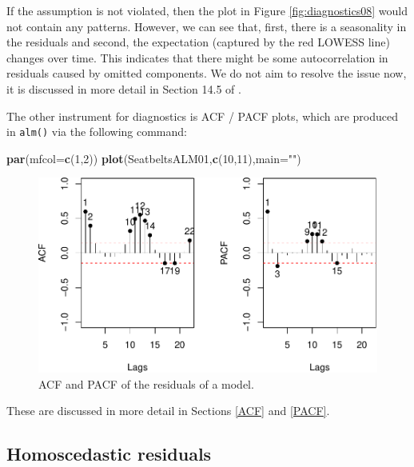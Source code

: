 \documentclass[
]{book}
\newenvironment{Shaded}{\begin{snugshade}}{\end{snugshade}}
\newcommand{\DataTypeTok}[1]{\textcolor[rgb]{0.13,0.29,0.53}{#1}}
\newcommand{\DecValTok}[1]{\textcolor[rgb]{0.00,0.00,0.81}{#1}}
\newcommand{\KeywordTok}[1]{\textcolor[rgb]{0.13,0.29,0.53}{\textbf{#1}}}
\newcommand{\NormalTok}[1]{#1}
\newcommand{\StringTok}[1]{\textcolor[rgb]{0.31,0.60,0.02}{#1}}
\theoremstyle{definition}
\theoremstyle{definition}
\theoremstyle{definition}
\theoremstyle{definition}
\theoremstyle{remark}
\begin{document}
If the assumption is not violated, then the plot in Figure \ref{fig:diagnostics08} would not contain any patterns. However, we can see that, first, there is a seasonality in the residuals and second, the expectation (captured by the red LOWESS line) changes over time. This indicates that there might be some autocorrelation in residuals caused by omitted components. We do not aim to resolve the issue now, it is discussed in more detail in Section 14.5 of \citet{SvetunkovADAM}.

The other instrument for diagnostics is ACF / PACF plots, which are produced in \texttt{alm()} via the following command:

\begin{Shaded}
\begin{Highlighting}[]
\KeywordTok{par}\NormalTok{(}\DataTypeTok{mfcol=}\KeywordTok{c}\NormalTok{(}\DecValTok{1}\NormalTok{,}\DecValTok{2}\NormalTok{))}
\KeywordTok{plot}\NormalTok{(SeatbeltsALM01,}\KeywordTok{c}\NormalTok{(}\DecValTok{10}\NormalTok{,}\DecValTok{11}\NormalTok{),}\DataTypeTok{main=}\StringTok{""}\NormalTok{)}
\end{Highlighting}
\end{Shaded}

\begin{figure}
\centering
\includegraphics{Svetunkov---Statistics-for-Business-Analytics_files/figure-latex/diagnostics09-1.pdf}
\caption{\label{fig:diagnostics09}ACF and PACF of the residuals of a model.}
\end{figure}

These are discussed in more detail in Sections \ref{ACF} and \ref{PACF}.

\hypertarget{assumptionsResidualsAreIIDHomoscedasticity}{%
\subsection{Homoscedastic residuals}\label{assumptionsResidualsAreIIDHomoscedasticity}}
\end{document}
